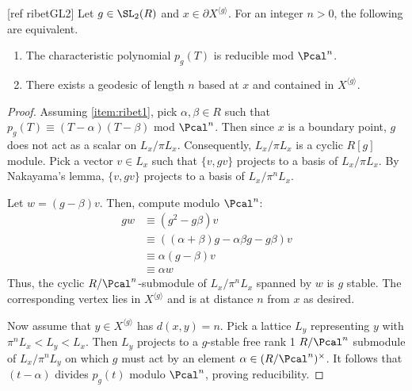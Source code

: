 \documentclass{amsart}
\begin{document}
	
	\begin{prop}\label{prop:ribetgl2}[ref ribetGL2]
		Let $g\in \SL_{2}(R)$ and $x \in \partial X^{\langle g \rangle }$. For an integer $n>0$, the following are equivalent.
		\begin{enumerate}
			\item\label{item:ribet1} The characteristic polynomial $p_{g}(T)$ is reducible mod $\Pcal^{n}$.
			\item\label{item:ribet2} There exists a geodesic of length $n$ based at $x$ and contained in $X^{\langle g \rangle}$.
		\end{enumerate}
	\end{prop}
	\begin{proof}
		Assuming \cref{item:ribet1}, pick $\alpha,\beta \in R$ such that $p_{g}(T) \equiv (T-\alpha)(T-\beta)$ mod $\Pcal^{n}$. Then since $x$ is a boundary point, $g$ does not act as a scalar on $L_{x}/\pi L_{x}$. Consequently, $L_{x}/\pi L_{x}$ is a cyclic $R[g]$ module. Pick a vector $v \in L_{x}$ such that $\{v, gv\}$ projects to a basis of $L_{x}/\pi L_{x}$. By Nakayama's lemma, $\{v,gv\}$ projects to a basis of $L_{x}/\pi^{n}L_{x}$.
		
		Let $w = (g-\beta)v$. Then, compute modulo $\Pcal^{n}$:
		\begin{align*}
			g w & \equiv (g^{2} -g \beta ) v                            \\
			& \equiv ((\alpha +\beta )g -\alpha\beta g - g\beta  )v \\
			& \equiv \alpha(g-\beta )v                              \\
			& \equiv \alpha w                                       
		\end{align*}
		Thus, the cyclic $R/\Pcal^{n}$-submodule of $L_{x}/\pi^{n}L_{x}$ spanned by $w$ is $g$ stable. The corresponding vertex lies in $X^{\langle g \rangle}$ and is at distance $n$ from $x$ as desired.
		
		Now assume that $y \in X^{\langle g \rangle }$ has $d(x,y)=n$. Pick a lattice
		$L_y$ representing $y$ with $\pi^n L_x < L_y <L_x$. Then $L_y$ projects to a
		$g$-stable free rank 1 $R/\Pcal^n$ submodule of $L_x / \pi^n L_y$ on which $g$
		must act by an element $\alpha \in (R/\Pcal^n)^\times$. It follows that
		$(t-\alpha)$ divides $p_g(t)$ modulo $\Pcal^n$, proving reducibility.
	\end{proof}
	
\end{document}
